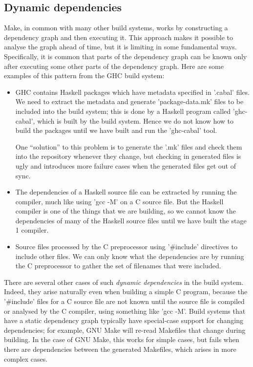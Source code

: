 \subsection{Dynamic dependencies\label{sec:dynamic-deps}}

Make, in common with many other build systems, works by
constructing a dependency graph and then executing it. This approach
makes it possible to analyse the graph ahead of
time, but it is limiting in some fundamental ways.  Specifically,
it is common that parts of the dependency graph can be known only after
executing some other parts of the dependency graph.  Here are some examples of
this pattern from the GHC build system:

\begin{itemize}
\item GHC contains Haskell packages which have metadata specified in
  \lst'.cabal' files. We need to extract the metadata and generate
  \lst'package-data.mk' files to be included into the build system; this
  is done by a Haskell program called \lst'ghc-cabal', which is built by the
  build system. Hence we do not know how to build the packages until we have
  built and run the \lst'ghc-cabal' tool.

  One ``solution'' to this problem is to generate the \lst'.mk'
  files and check them into the repository whenever they change, but
  checking in generated files is ugly and introduces more failure
  cases when the generated files get out of sync.

\item The dependencies of a Haskell source file can be extracted by
  running the compiler, much like using \lst'gcc -M' on a C source
  file.  But the Haskell compiler is one of the things that we are
  building, so we cannot know the dependencies of many of the Haskell
  source files until we have built the stage 1 compiler.

\item Source files processed by the C preprocessor using
  \lst'#include' directives to include other files.  We can only
  know what the dependencies are by running the C preprocessor to
  gather the set of filenames that were included.
\end{itemize}
\noindent
There are several other cases of such \emph{dynamic dependencies} in the build
system. Indeed, they arise naturally even when building a simple C program,
because the \lst'#include' files for a C source file are not known until the
source file is compiled or analysed by the C compiler, using something like
\lst'gcc -M'. Build systems that have a static dependency graph typically have
special-case support for changing dependencies; for example, GNU Make will re-read
Makefiles that change during building.  In the case of GNU Make,
this works for simple cases, but fails when there are dependencies
between the generated Makefiles, which arises in more complex cases.

